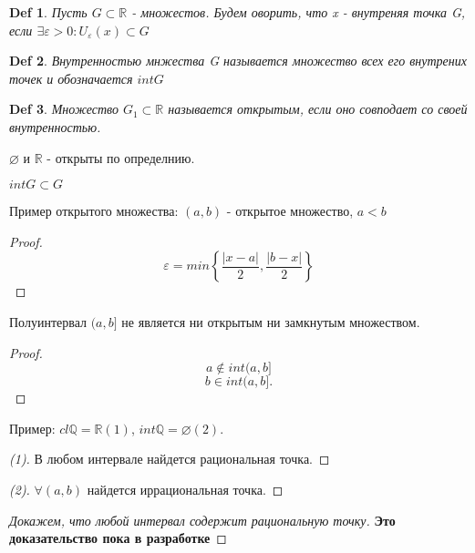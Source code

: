 \documentclass[a5paper, 10pt]{article}
\theoremstyle{plain}
\newtheorem{definition}{Def}
\newcommand{\Q}{\mathbb Q}
\newcommand{\R}{\mathbb R}
\newcommand{\eps}{\varepsilon}
\begin{document}
    \begin{definition}
        Пусть $ G \subset \R $ - множестов. Будем оворить, что x - внутреняя точка G,
        если $ \exists \eps > 0: U_{\eps}(x) \subset G $
    \end{definition}

    \begin{definition}
        Внутренностью мнжества G называется множество всех его внутрених точек и обозначается
        $ int G $
    \end{definition}

    \begin{definition}
        Множество $ G_1 \subset \R $ называется открытым, если оно совподает со
        своей внутренностью.
    \end{definition}

    $ \varnothing $ и $ \R $ - открыты по определнию.

    $ int G \subset G $

    Пример открытого множества:
    $ \left( a, b \right) $ - открытое множество, $ a < b $

    \begin{proof}
        \[
        \eps =min \left\{ \frac{\left| x - a \right| }{2}, \frac{\left| b - x \right| }{2} \right\}
        \]
    \end{proof}

    Полуинтервал $ (a, b] $ не является ни открытым ни замкнутым множеством.

    \begin{proof}
        \[
            a \not \in int (a, b]
        \] \[
            b \in int (a, b]
        .\]
    \end{proof}

    Пример:
    $ cl \Q = \R(1) $,
    $ int \Q = \varnothing(2) $.

    \begin{proof}[(1)]
        В любом интервале найдется рациональная точка.
    \end{proof}

    \begin{proof}[(2)]
        $ \forall (a, b) $ найдется иррациональная точка.
    \end{proof}

    \begin{proof}[Докажем, что любой интервал содержит рациональную точку]
        \textbf{Это доказательство пока в разработке}
    \end{proof}
\end{document}
